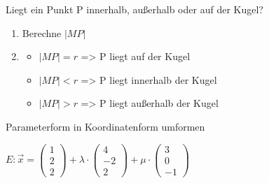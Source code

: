 \documentclass[paper=a6,landscape,ngerman,twoside=true,fontsize=12pt]{scrartcl}
\begin{document}
\begin{frage}
	\LARGE
	Liegt ein Punkt P innerhalb, außerhalb oder auf der Kugel?
\end{frage}
\begin{antwort}
		
	\begin{enumerate} 
		\item Berechne $|MP|$
		\item\normalsize 	\begin{itemize}
				\item $|MP|=r$ => P liegt auf der Kugel
				\item $|MP|<r$ => P liegt innerhalb der Kugel
				\item $|MP|>r$ => P liegt außerhalb der Kugel
				\end{itemize}	
	\end{enumerate} 
	
\end{antwort}	
\begin{frage}
	\LARGE
	Parameterform in Koordinatenform umformen
	\bigskip
	
		$E:\vec{x}=\left(\begin{array}{c} 1 \\ 2 \\ 2\end{array} \right)+\lambda \cdot \left(\begin{array}{c} 4 \\ -2 \\ 2\end{array} \right)+\mu \cdot \left(\begin{array}{c} 3 \\0 \\ -1\end{array} \right)$
\end{frage}
\end{document}
